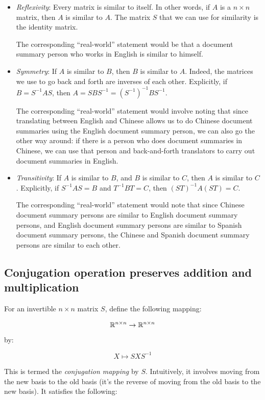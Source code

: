 \documentclass[10pt]{amsart}
\begin{document}
\begin{itemize}
\item {\em Reflexivity}: Every matrix is similar to itself. In other
  words, if $A$ is a $n \times n$ matrix, then $A$ is similar to
  $A$. The matrix $S$ that we can use for similarity is the identity
  matrix.

  The corresponding ``real-world'' statement would be that a document
  summary person who works in English is similar to himself.
\item {\em Symmetry}: If $A$ is similar to $B$, then $B$ is similar to
  $A$. Indeed, the matrices we use to go back and forth are inverses
  of each other. Explicitly, if $B = S^{-1}AS$, then $A = SBS^{-1} =
  (S^{-1})^{-1}BS^{-1}$.

  The corresponding ``real-world'' statement would involve noting that
  since translating between English and Chinese allows us to do
  Chinese document summaries using the English document summary
  person, we can also go the other way around: if there is a person
  who does document summaries in Chinese, we can use that person and
  back-and-forth translators to carry out document summaries in
  English.
\item {\em Transitivity}: If $A$ is similar to $B$, and $B$ is similar
  to $C$, then $A$ is similar to $C$. Explicitly, if $S^{-1}AS = B$
  and $T^{-1}BT = C$, then $(ST)^{-1}A(ST) = C$.

  The corresponding ``real-world'' statement would note that since
  Chinese document summary persons are similar to English document
  summary persons, and English document summary persons are similar to
  Spanish document summary persons, the Chinese and Spanish document
  summary persons are similar to each other.
\end{itemize}

\subsection{Conjugation operation preserves addition and multiplication}

For an invertible $n \times n$ matrix $S$, define the following mapping:

$$\mathbb{R}^{n \times n} \to \mathbb{R}^{n \times n}$$

by:

$$X \mapsto SXS^{-1}$$

This is termed the {\em conjugation mapping} by $S$. Intuitively, it
involves moving from the new basis to the old basis (it's the reverse
of moving from the old basis to the new basis). It satisfies the
following:
\end{document}
